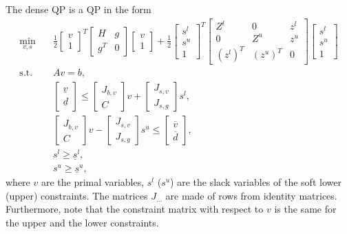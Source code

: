 \documentclass[a4paper]{report}
\begin{document}
The dense QP is a QP in the form
\begin{align*}
\min_{v,s} & \quad \frac 1 2 \begin{bmatrix} v \\ 1 \end{bmatrix}^T \begin{bmatrix} H & g \\ g^T & 0 \end{bmatrix} \begin{bmatrix} v \\ 1 \end{bmatrix} + \frac 1 2 \begin{bmatrix} s^l \\ s^u \\ 1 \end{bmatrix}^T \begin{bmatrix} Z^l & 0 & z^l \\ 0 & Z^u & z^u \\ (z^l)^T & (z^u)^T & 0 \end{bmatrix} \begin{bmatrix} s^l \\ s^u \\ 1 \end{bmatrix} \\
\text{s.t.} & \quad A v = b, \\
& \quad \begin{bmatrix} \underline v \\ \underline d \end{bmatrix} \leq \begin{bmatrix} J_{b,v} \\ C \end{bmatrix} v + \begin{bmatrix} J_{s,v} \\ J_{s,g} \end{bmatrix} s^l, \\
& \quad \begin{bmatrix} J_{b,v} \\ C \end{bmatrix} v - \begin{bmatrix} J_{s,v} \\ J_{s,g} \end{bmatrix} s^u \leq \begin{bmatrix} \overline v \\ \overline d \end{bmatrix}, \\
& \quad s^l\geq \underline s^l, \\
& \quad s^u\geq \underline s^u,
\end{align*}
where $v$ are the primal variables, $s^l$ ($s^u$) are the slack variables of the soft lower (upper) constraints.
The matrices $J_{\dots}$ are made of rows from identity matrices.
Furthermore, note that the constraint matrix with respect to $v$ is the same for the upper and the lower constraints.
\end{document}
